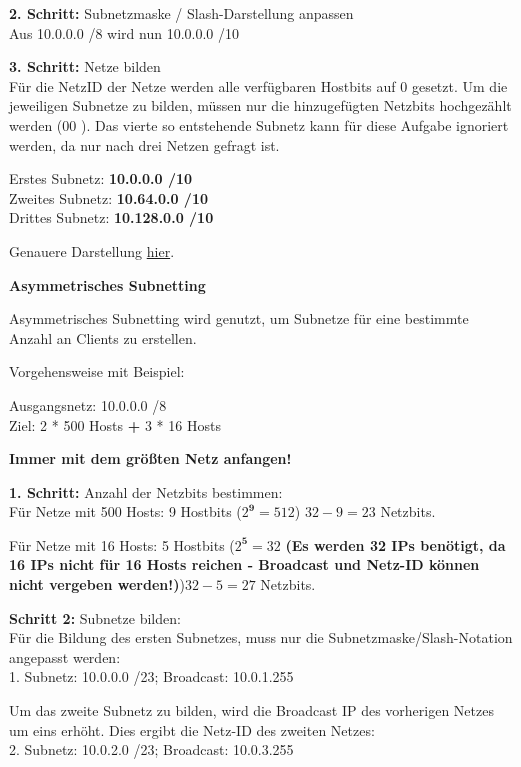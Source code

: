 \documentclass[10pt]{article}
\begin{document}
\textbf{2. Schritt:} Subnetzmaske / Slash-Darstellung anpassen\\
Aus 10.0.0.0 /8 wird nun 10.0.0.0 /10

\textbf{3. Schritt:} Netze bilden\\
Für die NetzID der Netze werden alle verfügbaren Hostbits auf 0 gesetzt. Um die jeweiligen Subnetze zu bilden, müssen nur die hinzugefügten Netzbits hochgezählt werden (00 \textrightarrow{} \textrightarrow{}). Das vierte so entstehende Subnetz kann für diese Aufgabe ignoriert werden, da nur nach drei Netzen gefragt ist.

Erstes Subnetz: \textbf{10.0.0.0 /10}\\
Zweites Subnetz: \textbf{10.64.0.0 /10}\\
Drittes Subnetz: \textbf{10.128.0.0 /10}

Genauere Darstellung \href{https://jodies.de/ipcalc?host=10.0.0.0&mask1=8&mask2=10}{hier}.

\break

\textbf{Asymmetrisches Subnetting}

Asymmetrisches Subnetting wird genutzt, um Subnetze für eine bestimmte Anzahl an Clients zu erstellen.

Vorgehensweise mit Beispiel:

Ausgangsnetz: 10.0.0.0 /8\\
Ziel: 2 * 500 Hosts \textbf{+} 3 * 16 Hosts 

\textbf{Immer mit dem größten Netz anfangen!} 

\textbf{1. Schritt:} Anzahl der Netzbits bestimmen:\\
Für Netze mit 500 Hosts: 9 Hostbits (\(2^\textbf{9} = 512\)) \textrightarrow\space \(32-9 = 23\) Netzbits.

Für Netze mit 16 Hosts: 5 Hostbits (\(2^\textbf{5} = 32\) \textbf{(Es werden 32 IPs benötigt, da 16 IPs nicht für 16 Hosts reichen - Broadcast und Netz-ID können nicht vergeben werden!)})\textrightarrow\space \(32-5 = 27\) Netzbits.

\textbf{Schritt 2:} Subnetze bilden:\\
Für die Bildung des ersten Subnetzes, muss nur die Subnetzmaske/Slash-Notation angepasst werden:\\
1. Subnetz: 10.0.0.0 /23; Broadcast: 10.0.1.255

Um das zweite Subnetz zu bilden, wird die Broadcast IP des vorherigen Netzes um eins erhöht. Dies ergibt die Netz-ID des zweiten Netzes:\\
2. Subnetz: 10.0.2.0 /23; Broadcast: 10.0.3.255
\end{document}
